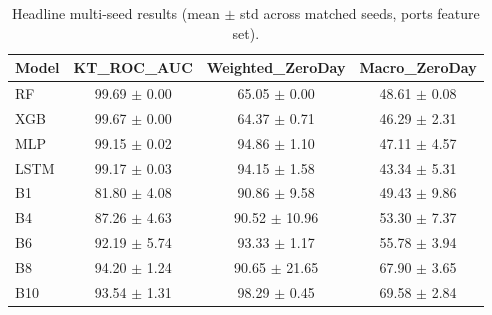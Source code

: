 \begin{table}[t]
\centering
\caption{Headline multi-seed results (mean $\pm$ std across matched seeds, ports feature set).}
\label{tab:multiseed-main}
\begin{tabular}{lccc}
\toprule
Model & KT\_ROC\_AUC & Weighted\_ZeroDay & Macro\_ZeroDay \\
\midrule
RF & 99.69 $\pm$ 0.00 & 65.05 $\pm$ 0.00 & 48.61 $\pm$ 0.08 \\
XGB & 99.67 $\pm$ 0.00 & 64.37 $\pm$ 0.71 & 46.29 $\pm$ 2.31 \\
MLP & 99.15 $\pm$ 0.02 & 94.86 $\pm$ 1.10 & 47.11 $\pm$ 4.57 \\
LSTM & 99.17 $\pm$ 0.03 & 94.15 $\pm$ 1.58 & 43.34 $\pm$ 5.31 \\
B1 & 81.80 $\pm$ 4.08 & 90.86 $\pm$ 9.58 & 49.43 $\pm$ 9.86 \\
B4 & 87.26 $\pm$ 4.63 & 90.52 $\pm$ 10.96 & 53.30 $\pm$ 7.37 \\
B6 & 92.19 $\pm$ 5.74 & 93.33 $\pm$ 1.17 & 55.78 $\pm$ 3.94 \\
B8 & 94.20 $\pm$ 1.24 & 90.65 $\pm$ 21.65 & 67.90 $\pm$ 3.65 \\
B10 & 93.54 $\pm$ 1.31 & 98.29 $\pm$ 0.45 & 69.58 $\pm$ 2.84 \\
\bottomrule
\end{tabular}
\end{table}
